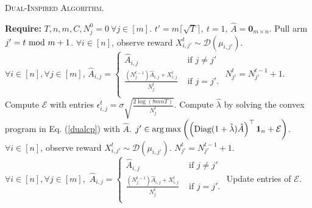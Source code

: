 \begin{algorithm}
\caption{\textsc{Dual-Inspired Algorithm.}}
\label{alg-dual}
\begin{algorithmic}[1]
\STATE \textbf{Require:} $T, n, m , C, N_{j}^{0}=0 \ \forall j \in [m]$.
\STATE $t'=m\lceil \sqrt{T} \rceil, \ t=1$,  $\widehat{A}=\mathbf{0}_{m\times n}$.
\STATE Pull arm $j'=t \textup{ mod } m + 1$.
\STATE $\forall i \in [n]$, observe reward $X_{i, j'}^{t}\sim \mathcal{D}(\mu_{i,j'})$.
\STATE $\forall i \in[n], \forall j \in[m]$, $\widehat{A}_{i,j} = 
    \begin{cases}
     \widehat{A}_{i,j} & \text{ if }  j\neq j'  \\
      \frac{(N_{j}^{t-1}) \widehat{A}_{i,j} + X_{i,j}^t}{N_{j}^{t}}  & \text{ if } j =j'. \\ 
      \end{cases}$
\STATE $N_{j'}^ t = N_{j'}^{t-1}+1.$
\ENDFOR
\STATE Compute $\mathcal{E}$ with entries $\epsilon_{i,j}^t=\sigma\sqrt{\frac{2\log{(8mnT)}}{N_{j}^{t}}}.$
\STATE Compute $\hat{\lambda}$ by solving the convex program in Eq. (\ref{dualcp}) with $\hat{A}$.
\STATE $j'\in \operatorname*{arg\,max} \left( \left(\textup{Diag}(1+\hat{\lambda})\hat{A}\right)^\top \mathbf{1}_n + \mathcal{E}\right)$.
\STATE $\forall i \in [n]$, observe reward $X_{i, j'}^t\sim \mathcal{D}(\mu_{i,j'})$.
\STATE $N_{j'}^{t} = N_{j'}^{t-1}+1.$
\STATE  $\forall i \in[n], \forall j \in[m],$
$\widehat{A}_{i,j} = 
    \begin{cases}
     \widehat{A}_{i,j} & \text{ if }  j\neq j'  \\
      \frac{(N_{j}^{t-1}) \widehat{A}_{i,j} + X_{i,j}^t}{N_{j}^{t}}  & \text{ if } j =j'. \\ 
      \end{cases}$
\STATE \STATE Update entries of $\mathcal{E}$.
\ENDFOR

 \end{algorithmic}
\end{algorithm}